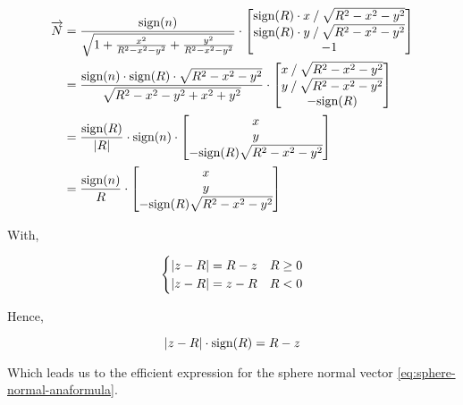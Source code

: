 \begin{equation} \begin{split}
\overrightarrow{N} & = \frac{\textrm{sign}(n)}
{\sqrt{1 + \frac{x^2}{R^2 - x^2 - y^2} + \frac{y^2}{R^2 - x^2 - y^2}}} \cdot
\begin{bmatrix}
\textrm{sign}(R) \cdot x \mathbin{/} \sqrt{R^2 - x^2 - y^2} \\
\textrm{sign}(R) \cdot y \mathbin{/} \sqrt{R^2 - x^2 - y^2} \\
-1
\end{bmatrix} \\
& = \frac{\textrm{sign}(n) \cdot \textrm{sign}(R) \cdot
          \sqrt{R^2 - x^2 - y^2}}
         {\sqrt{R^2 - x^2 - y^2 + x^2 + y^2}} \cdot
\begin{bmatrix}
x \mathbin{/} \sqrt{R^2 - x^2 - y^2} \\
y \mathbin{/} \sqrt{R^2 - x^2 - y^2} \\
-\textrm{sign}(R)
\end{bmatrix} \\
& = \frac{\textrm{sign}(R)}{\abs{R}} \cdot \textrm{sign}(n) \cdot
\begin{bmatrix}
x \\ y \\
- \textrm{sign}(R) \sqrt{R^2 - x^2 - y^2}
\end{bmatrix} \\
& = \frac{\textrm{sign}(n)}{R} \cdot
\begin{bmatrix}
x \\ y \\
- \textrm{sign}(R) \sqrt{R^2 - x^2 - y^2}
\end{bmatrix}
\end{split} \end{equation}

With,

\begin{equation} \begin{cases}
\abs{z-R} = R - z & R \geq 0 \\
\abs{z-R} = z - R & R < 0
\end{cases} \end{equation}

Hence,

\begin{equation}
\abs{z-R} \cdot \textrm{sign}(R) = R - z
\end{equation}

Which leads us to the efficient expression for the sphere normal vector
\cref{eq:sphere-normal-anaformula}.

